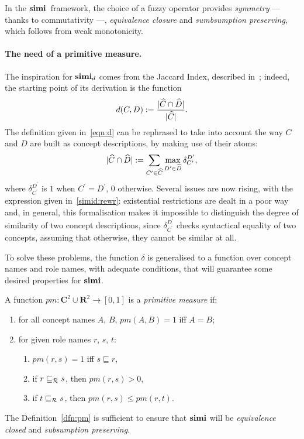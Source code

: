 In the \(\operatorname{\mathbf{simi}}{}\) framework, the choice of a fuzzy operator provides \emph{symmetry} --- thanks to commutativity ---, \emph{equivalence closure} and \emph{sumbsumption preserving}, which follows from weak monotonicity.

\paragraph{The need of a primitive measure.}
The inspiration for \(\operatorname{\mathbf{simi}}_d\) comes from the Jaccard Index, described in~\cite{Ja01};
indeed, the starting point of its derivation is the function
\begin{equation}
  \label{eqn:d}
  d(C,D) :=
\frac{\lvert \widehat{C} \cap \widehat{D} \rvert}{\lvert \widehat{C} \rvert}.
\end{equation}
The definition given in~\eqref{eqn:d} can be rephrased to take into account the way \(C\) and \(D\) are built as concept descriptions, by making use of their atoms:
\begin{equation}
  \label{simid:rewr}
  \lvert \widehat{C} \cap \widehat{D} \rvert := \sum_{C^\prime \in \widehat{C}}\max_{D^\prime \in \widehat{D}}
                                  \delta_{C^\prime}^{D^\prime},
\end{equation}
where \(\delta_{C^\prime}^{D^\prime}\) is \(1\) when \(C^\prime = D^\prime\), \(0\) otherwise.
Several issues are now rising, with the expression given in~\eqref{simid:rewr}:
existential restrictions are dealt in a poor way and, in general, this formalisation makes it impossible to distinguish the degree of similarity of two concept descriptions, since \(\delta_{C^\prime}^{D^\prime}\) checks syntactical equality of two concepts, assuming that otherwise, they cannot be similar at all.

To solve these problems, the function \(\delta\) is generalised to a function over concept names and role names, with adequate conditions, that will guarantee some desired properties for \(\operatorname{\mathbf{simi}}\).
\begin{definition}
  \label{dfn:pm}
  A function \(pm \colon \mathbf{C}^2 \cup \mathbf{R}^2 \to [0,1]\) is a \emph{primitive measure} if:
  \begin{enumerate}
    \item for all concept names \(A\), \(B\), \(pm(A,B) = 1\) iff \(A = B\);
    \item for given role names \(r\), \(s\), \(t\):
    \begin{enumerate}
      \item \(pm(r,s) = 1\) iff \(s \sqsubseteq r\),
      \item if \(r \sqsubseteq_{\mathcal{R}} s\), then \(pm(r,s) > 0\),
      \item if \(t \sqsubseteq_{\mathcal{R}} s\), then \(pm(r,s) \le pm(r,t)\).
    \end{enumerate}
  \end{enumerate}
\end{definition}
The Definition~\ref{dfn:pm} is sufficient to ensure that \(\operatorname{\mathbf{simi}}\) will be \emph{equivalence closed} and \emph{subsumption preserving}.

